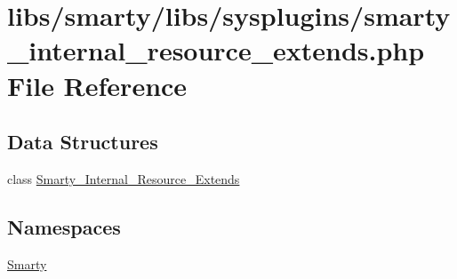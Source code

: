 \hypertarget{smarty__internal__resource__extends_8php}{}\section{libs/smarty/libs/sysplugins/smarty\+\_\+internal\+\_\+resource\+\_\+extends.php File Reference}
\label{smarty__internal__resource__extends_8php}
\subsection*{Data Structures}
\begin{DoxyCompactItemize}
\item 
class \hyperlink{class_smarty___internal___resource___extends}{Smarty\+\_\+\+Internal\+\_\+\+Resource\+\_\+\+Extends}
\end{DoxyCompactItemize}
\subsection*{Namespaces}
\begin{DoxyCompactItemize}
\item 
 \hyperlink{namespace_smarty}{Smarty}
\end{DoxyCompactItemize}
